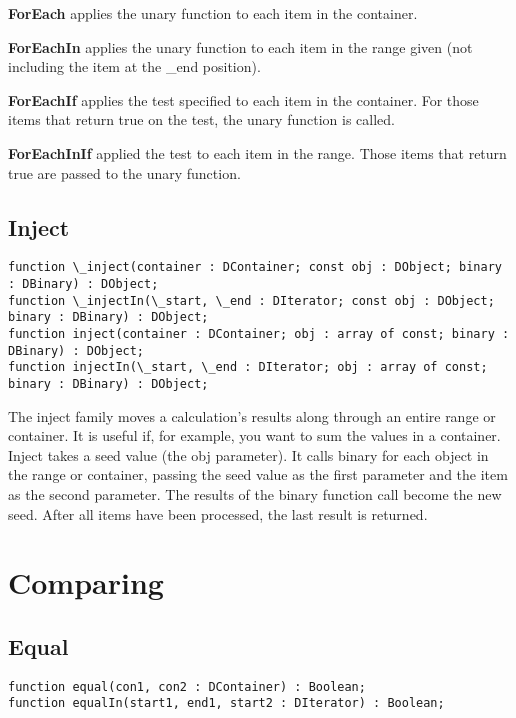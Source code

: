 \documentclass{report}
\begin{document}
\textbf{ForEach}  applies the unary function to each item in the container.

\textbf{ForEachIn} applies the unary function to each item in the range 
given (not including the  item at the \_end position).

\textbf{ForEachIf } applies the test specified to each item in the
container.  For those items that return true on the test, the unary function
is called.

\textbf{ForEachInIf} applied the test to each item in the range. Those items 
that return true are passed to the unary function.

\subsection{Inject}

\begin{lstlisting}
function \_inject(container : DContainer; const obj : DObject; binary : DBinary) : DObject;
function \_injectIn(\_start, \_end : DIterator; const obj : DObject; binary : DBinary) : DObject;
function inject(container : DContainer; obj : array of const; binary : DBinary) : DObject;
function injectIn(\_start, \_end : DIterator; obj : array of const; binary : DBinary) : DObject;
\end{lstlisting}

The inject family moves a calculation's results along through an entire
range or container. It is useful if, for example, you want to sum the values
in a container. Inject takes a seed value (the obj parameter). It calls
binary for each object in the range or container, passing the seed value as
the first parameter and the item as the second parameter. The results of the
binary function call become the new seed. After all items have been
processed, the last result is returned.

\section{Comparing}

\subsection{Equal}

\begin{lstlisting}
function equal(con1, con2 : DContainer) : Boolean;
function equalIn(start1, end1, start2 : DIterator) : Boolean;
\end{lstlisting}
\end{document}
